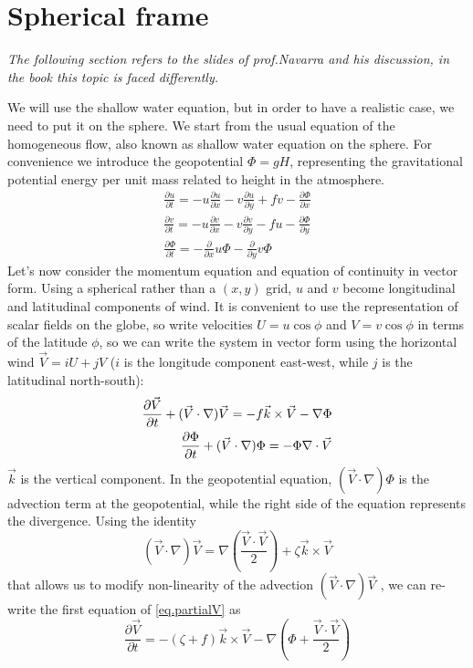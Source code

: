 \section{Spherical frame}\label{Sec:models on the sphere} 
\begin{center}
    \textit{The following section refers to the slides of prof.Navarra and his discussion, in the book this topic is faced differently.}
\end{center}
We will use the shallow water equation, but in order to have a realistic case, we need to put it on the sphere. We start from the usual equation of the homogeneous flow, also known as shallow water equation on the sphere. For convenience we introduce the geopotential $\Phi= gH$, representing the gravitational potential energy per unit mass related to height in the atmosphere. 
\begin{align}
    \frac{\partial u}{\partial t}=-u\frac{\partial u}{\partial x}-v\frac{\partial u}{\partial y}+fv-\frac{\partial\Phi}{\partial x}\\
    \frac{\partial v}{\partial t}=-u\frac{\partial v}{\partial x}-v\frac{\partial v}{\partial y}-fu-\frac{\partial\Phi}{\partial y}\\
    \frac{\partial\Phi}{\partial t}=-\frac{\partial}{\partial x}u\Phi-\frac{\partial}{\partial y}v\Phi
\end{align}
Let's now consider the momentum equation and equation of continuity in vector form. Using a spherical rather than a $(x,y)$ grid, $u$ and $v$ become longitudinal and latitudinal components of wind. It is convenient to use the representation of scalar fields on the globe, so  write velocities $U=u\cos\phi$ and $V=v\cos\phi$ in terms of the latitude $\phi$, so we can write the system in vector form using the horizontal wind $\vec{V}=iU+jV$ ($i$ is the longitude component east-west, while $j$ is the latitudinal north-south):
\begin{align}\label{eq.partialV}
    \frac{\partial\vec{V}}{\partial t}+(\vec{V}\cdot\nabla)\vec{V}=-f\vec{k}\times\vec{V}-\nabla\Phi \\
    \frac{\partial\Phi}{\partial t}+(\vec{V}\cdot\nabla)\Phi=-\Phi\nabla\cdot\vec{V}\notag
\end{align}
 $\vec{k}$ is the vertical component. In the geopotential equation, $(\vec{V}\cdot\nabla)\Phi$ is the advection term at the geopotential, while the right side of the equation represents the divergence. 
Using the identity
$$(\vec{V}\cdot\nabla)\vec{V}=\nabla\left(\frac{\vec{V}\cdot\vec{V}}{2}\right)+\zeta\vec{k}\times\vec{V}$$
that allows us to modify non-linearity of the advection $(\vec{V}\cdot\nabla)\vec{V}$ , we can re-write the first equation of \ref{eq.partialV} as
\begin{equation}\label{eq.V}
    \frac{\partial\vec{V}}{\partial t}=-(\zeta+f)\vec{k}\times\vec{V}-\nabla\left(\Phi+\frac{\vec{V}\cdot\vec{V}}{2}\right)
\end{equation}


